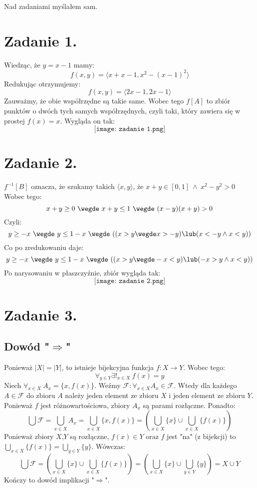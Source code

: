 \documentclass{article}
\begin{document}
 
 
 
 
 
 
 
 
 
 
 
\maketitle
Nad zadaniami myślałem sam.
\section*{Zadanie 1.}
Wiedząc, że $y=x-1$ mamy: 
\[f(x,y) = \langle x + x - 1, x^2 - (x-1)^2\rangle\]
Redukując otrzymujemy:
\[f(x,y) = \langle 2x - 1, 2x - 1\rangle\]
Zauważmy, że obie współrzędne są takie same. Wobec tego $f[A]$ to zbiór punktów o dwóch tych samych współrzędnych, czyli taki, który zawiera się w prostej $f(x)=x$. Wygląda on tak:
\[\texttt{[image: zadanie 1.png]}\]


\section*{Zadanie 2.}

$f^{-1}[B]$ oznacza, że szukamy takich $\langle x,y\rangle$, że $x+y \in [0,1]\ \wedge \ x^2 - y^2 >0 $ Wobec tego:
\[x+y \geq 0 \ \wegde \ x + y \leq 1 \ \wegde  \ (x-y)(x+y) >0 \]
Czyli:
\[ y\geq -x \ \wegde \ y \leq 1-x \ \wegde \ ((x>y \wegde x > -y)  \lub (x<-y \wedge x<y)) \]
Co po zredukowaniu daje:
\[ y\geq -x \ \wegde \ y \leq 1-x \ \wegde \ ((x>y \wegde -x < y)  \lub (-x>y \wedge x<y)) \]
Po narysowaniu w płaszczyźnie, zbiór wygląda tak:
\[\texttt{[image: zadanie 2.png]}\]


\section*{Zadanie 3.}

\subsection*{Dowód "$\Rightarrow$"}
Ponieważ $|X| = |Y|$, to istnieje bijekcyjna funkcja $f: X \rightarrow Y$. Wobec tego:
\[\forall_{y \in Y} \exists!_{x \in X} \ f(x) = y \]
Niech $\forall_{x \in X} \ A_x = \{ x,f(x)\} $. Weźmy $\mathcal{F}: \forall_{x \in X} A_x \in \mathcal{F} $. Wtedy dla każdego $A \in \mathcal{F}$ do zbioru $A$ należy jeden element ze zbioru $X$ i jeden element ze zbioru $Y$. Ponieważ $f$ jest różnowartościowa, zbiory $A_x$ są parami rozłączne. Ponadto: 
\[\bigcup \mathcal{F} = \bigcup_{x\in X} A_x= \bigcup_{x\in X} \{x,f(x)\} =  (\bigcup_{x\in X} \{x\} \cup \bigcup_{x\in X} \{f(x)\}) \]
Ponieważ zbiory $X$,$Y$ są rozłączne, $f(x) \in Y$ oraz $f$ jest "na" (z bijekcji) to $\bigcup_{x\in X} \{f(x)\} = \bigcup_{y\in Y} \{y\}$.  Wówczas:
\[ \bigcup \mathcal{F} = (\bigcup_{x\in X} \{x\} \cup \bigcup_{x\in X} \{f(x)\})= (\bigcup_{x\in X} \{x\} \cup \bigcup_{y\in Y} \{y\}) = X\cup Y\]
Kończy to dowód implikacji "$\Rightarrow$". 
\end{document}
